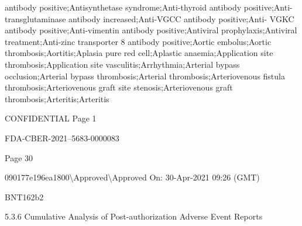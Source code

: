 \begin{refsection}
\begin{tcolorbox}[quote]
antibody positive;Antisynthetase syndrome;Anti-thyroid antibody positive;Anti-transglutaminase antibody increased;Anti-VGCC antibody positive;Anti- VGKC antibody positive;Anti-vimentin antibody positive;Antiviral prophylaxis;Antiviral treatment;Anti-zinc transporter 8 antibody positive;Aortic embolus;Aortic thrombosis;Aortitis;Aplasia pure red cell;Aplastic anaemia;Application site thrombosis;Application site vasculitis;Arrhythmia;Arterial bypass occlusion;Arterial bypass thrombosis;Arterial thrombosis;Arteriovenous fistula thrombosis;Arteriovenous graft site stenosis;Arteriovenous graft thrombosis;Arteritis;Arteritis

CONFIDENTIAL Page 1

FDA-CBER-2021--5683-0000083

Page 30

090177e196ea1800\textbackslash{}Approved\textbackslash{}Approved On: 30-Apr-2021 09:26 (GMT)

BNT162b2

5.3.6 Cumulative Analysis of Post-authorization Adverse Event Reports


\end{tcolorbox}
\end{refsection}
